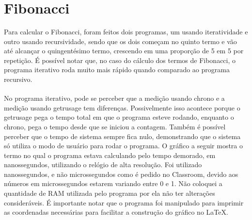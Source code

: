 \documentclass{article}
\begin{document}
\section{Fibonacci}
\paragraph{} Para calcular o Fibonacci, foram feitos dois programas, um usando iteratividade e outro usando recursividade, sendo que os dois começam no quinto termo e vão até alcançar o quingentésimo termo, crescendo em uma proporção de 5 em 5 por repetição. É possível notar que, no caso do cálculo dos termos de Fibonacci, o programa iterativo roda muito mais rápido quando comparado ao programa recursivo.
\paragraph{} No programa iterativo, pode se perceber que a medição usando chrono e a medição usando getrusage tem diferenças. Possivelmente isso acontece porque o getrusage pega o tempo total em que o programa esteve rodando, enquanto o chrono, pega o tempo desde que se iniciou a contagem. Também é possível perceber que o tempo de sistema sempre fica nulo, demonstrando que o sistema só utiliza o modo de usuário para rodar o programa. O gráfico a seguir mostra o termo no qual o programa estava calculando pelo tempo demorado, em nanossegundos, utilizando o relógio de alta resolução. Foi utilizado nanossegundos, e não microssegundos como é pedido no Classroom, devido aos números em microssegundos estarem variando entre 0 e 1. Não coloquei a quantidade de RAM utilizada pelo programa por ela não ter alterações consideráveis. É importante notar que o programa foi manipulado para imprimir as coordenadas necessárias para facilitar a construção do gráfico no \LaTeX.
\end{document}
